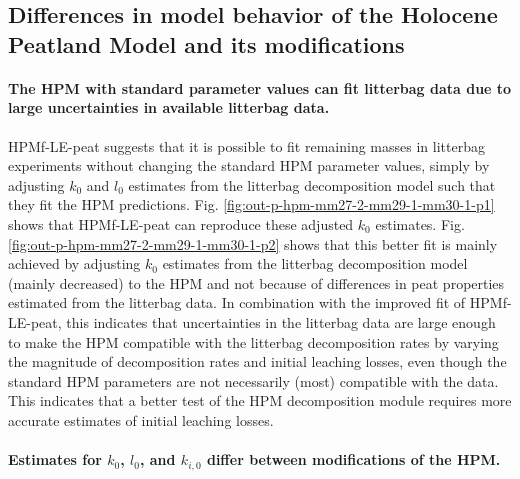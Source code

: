 \documentclass[
  12pt,
]{article}
\begin{document}
\hypertarget{differences-in-model-behavior-of-the-holocene-peatland-model-and-its-modifications}{%
\subsection{Differences in model behavior of the Holocene Peatland Model and its modifications}\label{differences-in-model-behavior-of-the-holocene-peatland-model-and-its-modifications}}

\hypertarget{the-hpm-with-standard-parameter-values-can-fit-litterbag-data-due-to-large-uncertainties-in-available-litterbag-data.}{%
\paragraph*{The HPM with standard parameter values can fit litterbag data due to large uncertainties in available litterbag data.}\label{the-hpm-with-standard-parameter-values-can-fit-litterbag-data-due-to-large-uncertainties-in-available-litterbag-data.}}

HPMf-LE-peat suggests that it is possible to fit remaining masses in litterbag experiments without changing the standard HPM parameter values, simply by adjusting \(k_0\) and \(l_0\) estimates from the litterbag decomposition model such that they fit the HPM predictions. Fig. \ref{fig:out-p-hpm-mm27-2-mm29-1-mm30-1-p1} shows that HPMf-LE-peat can reproduce these adjusted \(k_0\) estimates. Fig. \ref{fig:out-p-hpm-mm27-2-mm29-1-mm30-1-p2} shows that this better fit is mainly achieved by adjusting \(k_0\) estimates from the litterbag decomposition model (mainly decreased) to the HPM and not because of differences in peat properties estimated from the litterbag data. In combination with the improved fit of HPMf-LE-peat, this indicates that uncertainties in the litterbag data are large enough to make the HPM compatible with the litterbag decomposition rates by varying the magnitude of decomposition rates and initial leaching losses, even though the standard HPM parameters are not necessarily (most) compatible with the data. This indicates that a better test of the HPM decomposition module requires more accurate estimates of initial leaching losses.

\hypertarget{estimates-for-k_0-l_0-and-k_i0-differ-between-modifications-of-the-hpm.}{%
\paragraph*{\texorpdfstring{Estimates for \(k_0\), \(l_0\), and \(k_{i,0}\) differ between modifications of the HPM.}{Estimates for k\_0, l\_0, and k\_\{i,0\} differ between modifications of the HPM.}}\label{estimates-for-k_0-l_0-and-k_i0-differ-between-modifications-of-the-hpm.}}
\end{document}
